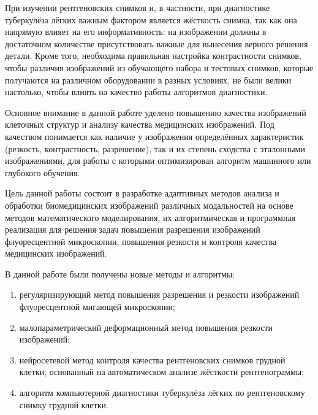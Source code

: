 При изучении рентгеновских снимков и, в частности, при диагностике туберкулёза лёгких важным фактором является жёсткость снимка, так как она напрямую влияет на его информативность: на изображении должны в достаточном количестве присутствовать важные для вынесения верного решения детали. Кроме того, необходима правильная настройка контрастности снимков, чтобы различия изображений из обучающего набора и тестовых снимков, которые получаются на различном оборудовании в разных условиях, не были велики настолько, чтобы влиять на качество работы алгоритмов диагностики.

Основное внимание в данной работе уделено повышению качества изображений клеточных структур и анализу качества медицинских изображений. Под качеством понимается как наличие у изображения определённых характеристик (резкость, контрастность, разрешение), так и их степень сходства с эталонными изображениями, для работы с которыми оптимизирован алгоритм машинного или глубокого обучения.


{\aim}

Цель данной работы состоит в разработке адаптивных методов анализа и обработки биомедицинских изображений различных модальностей на основе методов математического моделирования, их алгоритмическая и программная реализация для решения задач повышения разрешения изображений флуоресцентной микроскопии, повышения резкости и контроля качества медицинских изображений.


{\novelty}

В данной работе были получены новые методы и алгоритмы:
\begin{enumerate}[beginpenalty=10000]
 	\item регуляризирующий метод повышения разрешения и резкости изображений флуоресцентной мигающей микроскопии;

	\item малопараметрический деформационный метод повышения резкости изображений;

	\item нейросетевой метод контроля качества рентгеновских снимков грудной клетки, основанный на автоматическом анализе жёсткости рентгенограммы;
	
	\item алгоритм компьютерной диагностики туберкулёза лёгких по рентгеновскому снимку грудной клетки.
\end{enumerate}

